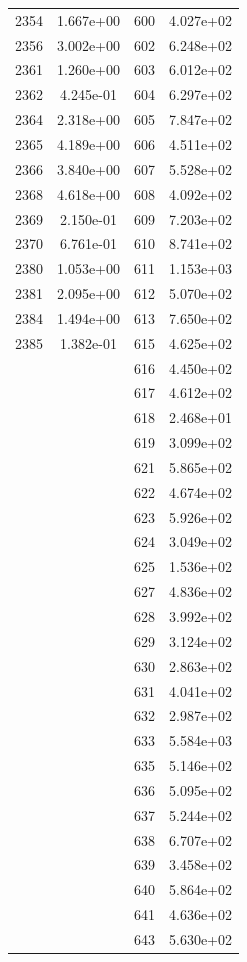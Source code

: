 \documentclass[12pt]{article}
\begin{document}
\begin{longtable}{@{}cccc@{}}
2354 & 1.667e+00 & 600 & 4.027e+02 \\
2356 & 3.002e+00 & 602 & 6.248e+02 \\
2361 & 1.260e+00 & 603 & 6.012e+02 \\
2362 & 4.245e-01 & 604 & 6.297e+02 \\
2364 & 2.318e+00 & 605 & 7.847e+02 \\
2365 & 4.189e+00 & 606 & 4.511e+02 \\
2366 & 3.840e+00 & 607 & 5.528e+02 \\
2368 & 4.618e+00 & 608 & 4.092e+02 \\
2369 & 2.150e-01 & 609 & 7.203e+02 \\
2370 & 6.761e-01 & 610 & 8.741e+02 \\
2380 & 1.053e+00 & 611 & 1.153e+03 \\
2381 & 2.095e+00 & 612 & 5.070e+02 \\
2384 & 1.494e+00 & 613 & 7.650e+02 \\
2385 & 1.382e-01 & 615 & 4.625e+02 \\
 &  & 616 & 4.450e+02 \\
 &  & 617 & 4.612e+02 \\
 &  & 618 & 2.468e+01 \\
 &  & 619 & 3.099e+02 \\
 &  & 621 & 5.865e+02 \\
 &  & 622 & 4.674e+02 \\
 &  & 623 & 5.926e+02 \\
 &  & 624 & 3.049e+02 \\
 &  & 625 & 1.536e+02 \\
 &  & 627 & 4.836e+02 \\
 &  & 628 & 3.992e+02 \\
 &  & 629 & 3.124e+02 \\
 &  & 630 & 2.863e+02 \\
 &  & 631 & 4.041e+02 \\
 &  & 632 & 2.987e+02 \\
 &  & 633 & 5.584e+03 \\
 &  & 635 & 5.146e+02 \\
 &  & 636 & 5.095e+02 \\
 &  & 637 & 5.244e+02 \\
 &  & 638 & 6.707e+02 \\
 &  & 639 & 3.458e+02 \\
 &  & 640 & 5.864e+02 \\
 &  & 641 & 4.636e+02 \\
 &  & 643 & 5.630e+02 \\

\end{longtable}
\end{document}
